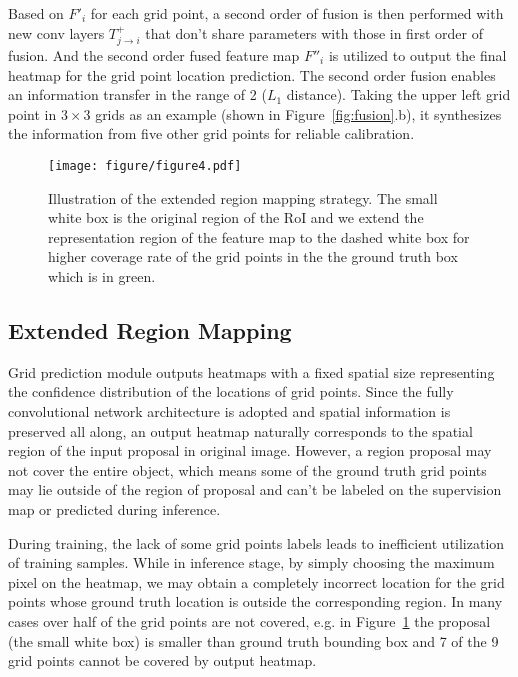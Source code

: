 \documentclass[10pt,twocolumn,letterpaper]{article}
\begin{document}
Based on $F'_i$ for each grid point, a second order of fusion is then performed with new conv layers $T^+_{j \rightarrow i}$ that don't share parameters with those in first order of fusion. And the second order fused feature map $F''_i$ is utilized to output the final heatmap for the grid point location prediction. The second order fusion enables an information transfer in the range of 2 ($L_1$ distance). Taking the upper left grid point in $3 \times 3$ grids as an example (shown in Figure~\ref{fig:fusion}.b), it synthesizes the information from five other grid points for reliable calibration.

\begin{figure}[t]
\centering
\texttt{[image: figure/figure4.pdf]}
\caption{Illustration of the extended region mapping strategy. The small white box is the original region of the RoI and we extend the representation region of the feature map to the dashed white box for higher coverage rate of the grid points in the the ground truth box which is in green.}
\label{fig:extend}
\end{figure}


\subsection{Extended Region Mapping}
\label{sec:cmapping}
Grid prediction module outputs heatmaps with a fixed spatial size representing the confidence distribution of the locations of grid points. Since the fully convolutional network architecture is adopted and spatial information is preserved all along, an output heatmap naturally corresponds to the spatial region of the input proposal in original image. However, a region proposal may not cover the entire object, which means some of the ground truth grid points may lie outside of the region of proposal and can't be labeled on the supervision map or predicted during inference. 

During training, the lack of some grid points labels leads to inefficient utilization of training samples. While in inference stage, by simply choosing the maximum pixel on the heatmap, we may obtain a completely incorrect location for the grid points whose ground truth location is outside the corresponding region. In many cases over half of the grid points are not covered, e.g. in Figure~\ref{fig:extend} the proposal (the small white box) is smaller than ground truth bounding box and 7 of the 9 grid points cannot be covered by output heatmap.
\end{document}
